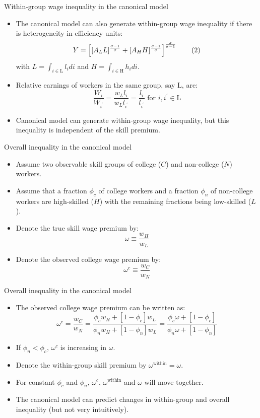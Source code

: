 \documentclass[notes=show]{beamer}
\begin{document}
\begin{frame}{Within-group wage inequality in the canonical model}
\begin{itemize}
\item The canonical model can also generate within-group wage inequality if there is heterogeneity in efficiency units:
\[
Y=\left[ [A_{L}L]^{\frac{\sigma -1}{\sigma }}+[A_{H}H]^{%
\frac{\sigma -1}{\sigma }}\right] ^{\frac{\sigma }{\sigma -1}} \tag{2}
\]
with $L=\int_{i\in \mathrm{L}}l_{i}di$ and $H=\int_{i\in \mathrm{H}}h_{i}di$.
\item Relative earnings of workers in the same group, say $\mathrm{L}$, are:
\[
\frac{W_{i}}{W_{i^{'}}} = \frac{w_{L}l_{i}}{w_{L}l_{i^{'}}} = \frac{l_{i}}{l_{i^{'}}} \text{ for } i,i^{'} \in \mathrm{L}
\]
\item Canonical model can generate within-group wage inequality, but this inequality is independent of the skill premium. 
\end{itemize}
\end{frame}

\begin{frame}{Overall inequality in the canonical model}
\begin{itemize}
\item Assume two observable skill groups of college ($C$) and non-college ($N$) workers. \medskip
\item Assume that a fraction $\phi_{c}$ of college workers and a fraction $ \phi_{n}$ of non-college workers are high-skilled ($H$) with the remaining fractions being low-skilled ($L$). \medskip
\item Denote the true skill wage premium by:
\[
\omega \equiv \frac{w_{H}}{w_{L}}
\]
\item Denote the observed college wage premium by:
\[
\omega^{c} \equiv \frac{w_{C}}{w_{N}}
\]
\end{itemize}
\end{frame}

\begin{frame}{Overall inequality in the canonical model}
\begin{itemize}
\item The observed college wage premium can be written as:
\[
\omega^{c} = \frac{w_{C}}{w_{N}} = \frac{\phi_{c}w_{H}+[1-\phi_c]w_{L}}{\phi_{n}w_{H}+[1-\phi_{n}]w_{L}} = \frac{\phi_{c} \omega + [1-\phi_c]}{\phi_{n} \omega +[1-\phi_{n}]}
\]
\item If $ \phi_{n} < \phi_{c}$, $ \omega^{c}$ is increasing in $ \omega $. \medskip
\item Denote the within-group skill premium by $ \omega^{\text{within}} = \omega $. \medskip
\item For constant $\phi_{c}$ and $\phi_{n}$,  $ \omega^{c}  $, $ \omega^{\text{within}} $ and $ \omega $ will move together. \medskip
\item The canonical model can predict changes in within-group and overall inequality (but not very intuitively).
\end{itemize}
\end{frame}
\end{document}
